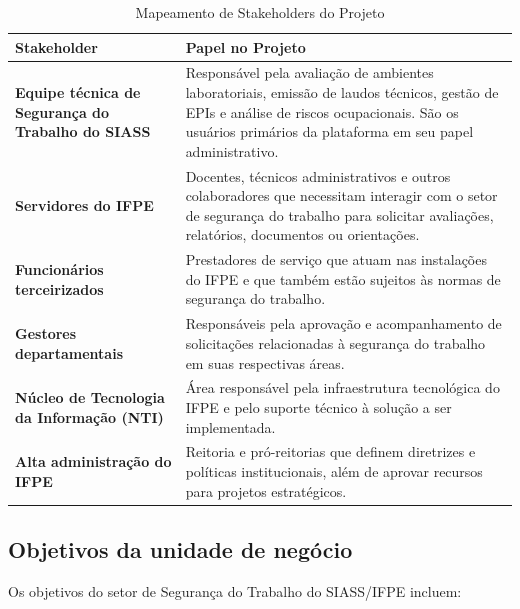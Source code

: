\documentclass[12pt,a4paper]{article}
\begin{document}
\begin{table}[h]
\centering
\begin{tcolorbox}[enhanced, colback=white, colframe=gray!40, arc=4mm, boxrule=1pt]
\begin{tabular}{p{4cm}p{10cm}}
\textbf{Stakeholder} & \textbf{Papel no Projeto} \\
\hline
\textbf{Equipe técnica de Segurança do Trabalho do SIASS} & Responsável pela avaliação de ambientes laboratoriais, emissão de laudos técnicos, gestão de EPIs e análise de riscos ocupacionais. São os usuários primários da plataforma em seu papel administrativo. \\
\hline
\textbf{Servidores do IFPE} & Docentes, técnicos administrativos e outros colaboradores que necessitam interagir com o setor de segurança do trabalho para solicitar avaliações, relatórios, documentos ou orientações. \\
\hline
\textbf{Funcionários terceirizados} & Prestadores de serviço que atuam nas instalações do IFPE e que também estão sujeitos às normas de segurança do trabalho. \\
\hline
\textbf{Gestores departamentais} & Responsáveis pela aprovação e acompanhamento de solicitações relacionadas à segurança do trabalho em suas respectivas áreas. \\
\hline
\textbf{Núcleo de Tecnologia da Informação (NTI)} & Área responsável pela infraestrutura tecnológica do IFPE e pelo suporte técnico à solução a ser implementada. \\
\hline
\textbf{Alta administração do IFPE} & Reitoria e pró-reitorias que definem diretrizes e políticas institucionais, além de aprovar recursos para projetos estratégicos. \\
\end{tabular}
\end{tcolorbox}
\caption{Mapeamento de Stakeholders do Projeto}
\end{table}

\subsection{Objetivos da unidade de negócio}
Os objetivos do setor de Segurança do Trabalho do SIASS/IFPE incluem:
\end{document}
